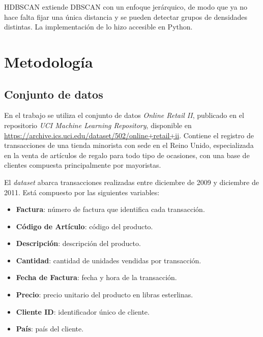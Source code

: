 \documentclass[a4paper,10pts,openany]{book}
\begin{document}
	HDBSCAN \citep{campello2013} extiende DBSCAN con un enfoque jerárquico, de modo que ya no hace falta fijar una única distancia y se pueden detectar grupos de densidades distintas. La implementación de \citet{mcinnes2017} lo hizo accesible en Python.
	
	
	
	\chapter{Metodología}
	\label{Sec:Métodos}
	
	\section{Conjunto de datos}
	
	En el trabajo se utiliza el conjunto de datos \emph{Online Retail II}, publicado en el repositorio \emph{UCI Machine Learning Repository}, disponible en \url{https://archive.ics.uci.edu/dataset/502/online+retail+ii}. Contiene el registro de transacciones de una tienda minorista con sede en el Reino Unido, especializada en la venta de artículos de regalo para todo tipo de ocasiones, con una base de clientes compuesta principalmente por mayoristas.
	
	El \emph{dataset} abarca transacciones realizadas entre diciembre de 2009 y diciembre de 2011. Está compuesto por las siguientes variables:
	
	\begin{itemize}
		\item \textbf{Factura}: número de factura que identifica cada transacción.
		\item \textbf{Código de Artículo}: código del producto.
		\item \textbf{Descripción}: descripción del producto.
		\item \textbf{Cantidad}: cantidad de unidades vendidas por transacción.
		\item \textbf{Fecha de Factura}: fecha y hora de la transacción.
		\item \textbf{Precio}: precio unitario del producto en libras esterlinas.
		\item \textbf{Cliente ID}: identificador único de cliente.
		\item \textbf{País}: país del cliente.
	\end{itemize}
	
\end{document}
